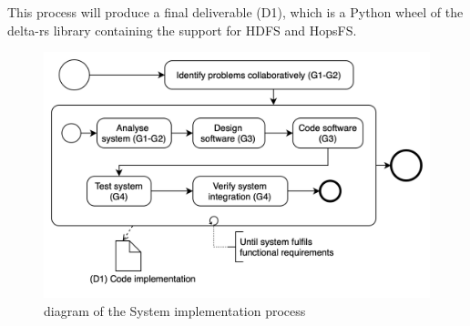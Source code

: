 This process will produce a final deliverable (D1), which is a Python wheel of the delta-rs library containing the support for \gls{HDFS} and \gls{HopsFS}.

\begin{figure}[!ht]
    \begin{center}
      \includegraphics[width=\textwidth]{figures/3-method/research_process_rq1.png}
    \caption{ diagram of the System implementation process}
    \label{fig:DevProcessRQ1}
    \end{center}
\end{figure}

